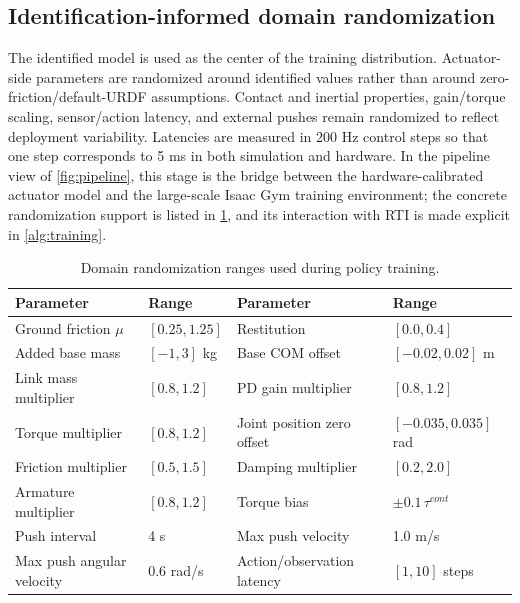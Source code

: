 \documentclass[twoside,final,1p,times]{elsarticle}
\newcommand{\rev}[1]{#1}
\begin{document}
\subsection{Identification-informed domain randomization}
\label{subsec:dr}
The identified model is used as the center of the training distribution. Actuator-side parameters are randomized around identified values rather than around zero-friction/default-URDF assumptions. Contact and inertial properties, gain/torque scaling, sensor/action latency, and external pushes remain randomized to reflect deployment variability. Latencies are measured in 200 Hz control steps so that one step corresponds to 5 ms in both simulation and hardware. \rev{In the pipeline view of \cref{fig:pipeline}, this stage is the bridge between the hardware-calibrated actuator model and the large-scale Isaac Gym training environment; the concrete randomization support is listed in \cref{tab:dr_ranges}, and its interaction with RTI is made explicit in \cref{alg:training}.}

\begin{table}[t]
\centering
\caption{Domain randomization ranges used during policy training.}
\label{tab:dr_ranges}
\small
\begin{tabular}{ll@{\qquad}ll}
\toprule
Parameter & Range & Parameter & Range \\
\midrule
Ground friction $\mu$ & $[0.25,1.25]$ & Restitution & $[0.0,0.4]$ \\
Added base mass & $[-1,3]$ kg & Base COM offset & $[-0.02,0.02]$ m \\
Link mass multiplier & $[0.8,1.2]$ & PD gain multiplier & $[0.8,1.2]$ \\
Torque multiplier & $[0.8,1.2]$ & Joint position zero offset & $[-0.035,0.035]$ rad \\
Friction multiplier & $[0.5,1.5]$ & Damping multiplier & $[0.2,2.0]$ \\
Armature multiplier & $[0.8,1.2]$ & Torque bias & $\pm0.1\,\tau^{cont}$ \\
Push interval & 4 s & Max push velocity & 1.0 m/s \\
Max push angular velocity & 0.6 rad/s & Action/observation latency & $[1,10]$ steps \\
\bottomrule
\end{tabular}
\end{table}
\end{document}
